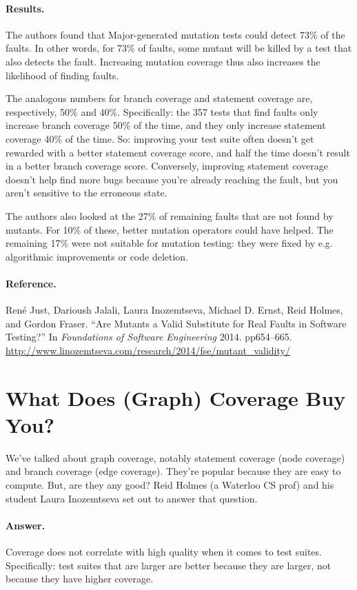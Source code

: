 \documentclass[11pt]{article}
\begin{document}
\paragraph{Results.} The authors found that Major-generated mutation
tests could detect 73\% of the faults.  In other words, for 73\% of
faults, some mutant will be killed by a test that also detects the
fault. Increasing mutation coverage thus also increases the likelihood
of finding faults.

The analogous numbers for branch coverage and statement coverage are,
respectively, 50\% and 40\%. Specifically: the 357 tests that find
faults only increase branch coverage 50\% of the time, and they only
increase statement coverage 40\% of the time. So: improving your test
suite often doesn't get rewarded with a better statement coverage
score, and half the time doesn't result in a better branch coverage
score. Conversely, improving statement coverage doesn't help find more bugs because
you're already reaching the fault, but you aren't sensitive to the erroneous state.

The authors also looked at the 27\% of remaining faults that
are not found by mutants. For 10\% of these, better mutation operators
could have helped. The remaining 17\% were not suitable for mutation testing:
they were fixed by e.g. algorithmic improvements or code deletion.

\paragraph{Reference.}
Ren\'e Just, Darioush Jalali, Laura Inozemtseva, Michael D. Ernst,
Reid Holmes, and Gordon Fraser. ``Are Mutants a Valid Substitute for
Real Faults in Software Testing?''  In {\em Foundations of Software
Engineering} 2014. pp654--665.
\url{http://www.linozemtseva.com/research/2014/fse/mutant_validity/}

\section*{What Does (Graph) Coverage Buy You?}
We've talked about graph coverage, notably statement coverage (node
coverage) and branch coverage (edge coverage). They're popular because
they are easy to compute. But, are they any good? Reid Holmes (a
Waterloo CS prof) and his student Laura Inozemtseva set out to answer
that question.

\paragraph{Answer.} Coverage does not correlate with high quality
when it comes to test suites.
Specifically: test suites that are larger are better because
they are larger, not because they have higher coverage.
\end{document}
